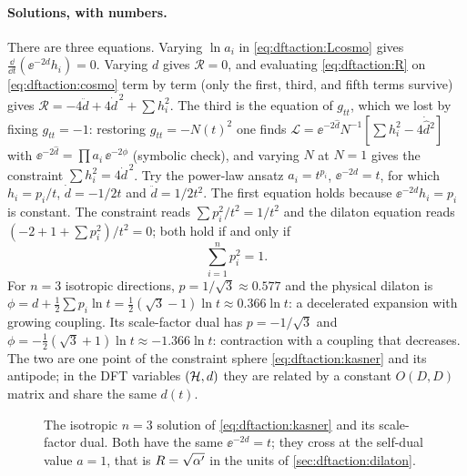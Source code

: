 \paragraph{Solutions, with numbers.} There are three equations. Varying $\ln a_i$ in
\eqref{eq:dftaction:Lcosmo} gives $\frac{\dd}{\dd t}(\ee^{-2d}h_i)=0$. Varying $d$ gives
$\mathcal R=0$, and evaluating \eqref{eq:dftaction:R} on \eqref{eq:dftaction:cosmo} term by term
(only the first, third, and fifth terms survive) gives
$\mathcal R=-4\ddot d+4\dot d^{\,2}+\sum h_i^2$. The third is the equation of $g_{tt}$, which we
lost by fixing $g_{tt}=-1$: restoring $g_{tt}=-N(t)^2$ one finds
$\mathcal L=\ee^{-2\hat d}N^{-1}[\sum h_i^2-4\dot{\hat d}{}^2]$ with
$\ee^{-2\hat d}=\prod a_i\,\ee^{-2\phi}$ (symbolic check), and varying $N$ at $N=1$ gives the
constraint $\sum h_i^2=4\dot d^{\,2}$. Try the power-law ansatz $a_i=t^{p_i}$, $\ee^{-2d}=t$, for
which $h_i=p_i/t$, $\dot d=-1/2t$ and $\ddot d=1/2t^2$. The first equation holds because
$\ee^{-2d}h_i=p_i$ is constant. The constraint reads $\sum p_i^2/t^2=1/t^2$ and the dilaton
equation reads $(-2+1+\sum p_i^2)/t^2=0$; both hold if and only if
\begin{equation}\label{eq:dftaction:kasner}
\sum_{i=1}^np_i^2=1 .
\end{equation} For $n=3$ isotropic directions, $p=1/\sqrt3\approx0.577$
and the physical dilaton is $\phi=d+\tfrac12\sum p_i\ln t=\tfrac12(\sqrt3-1)\ln t\approx
0.366\ln t$: a decelerated expansion with growing coupling. Its scale-factor dual has
$p=-1/\sqrt3$ and $\phi=-\tfrac12(\sqrt3+1)\ln t\approx-1.366\ln t$: contraction with a
coupling that decreases. The two are one point of the constraint sphere
\eqref{eq:dftaction:kasner} and its antipode; in the DFT variables $(\mathcal{H},d)$ they are related by
a constant $O(D,D)$ matrix and share the same $d(t)$.

\begin{figure}[ht]
\centering
{}
\caption{The isotropic $n=3$ solution of \eqref{eq:dftaction:kasner} and its scale-factor dual.
Both have the same $\ee^{-2d}=t$; they cross at the self-dual value $a=1$, that is
$R=\sqrt{\alpha'}$ in the units of \cref{sec:dftaction:dilaton}.}\label{fig:dftaction:sfd}
\end{figure}

